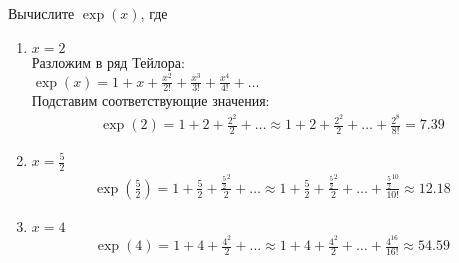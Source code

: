 		\subsection{}
		Вычислите $\exp(x)$, где	
		\begin{enumerate}
		\item $x = 2$\\
			Разложим в ряд Тейлора:\\
			$\exp(x) = 1 + x + \frac{x^{2}}{2!} + \frac{x^{3}}{3!} + \frac{x^{4}}{4!} + \ldots$\\
			Подставим соответствующие значения:\\
			\begin{gather*}
				\exp(2) = 1 + 2 + \frac{2^2}{2} + \ldots \approx 1 + 2 + \frac{2^2}{2} + \ldots + \frac{2^{8}}{8!} = 7.39
			\end{gather*}
		
		\item $x = \frac{5}{2}$\\
			\begin{gather*}
				\exp(\frac{5}{2}) = 1 + \frac{5}{2} + \frac{{\frac{5}{2}}^2}{2} + \ldots \approx 1 + \frac{5}{2} + \frac{{\frac{5}{2}}^2}{2} + \ldots + \frac{{\frac{5}{2}}^{10}}{10!} \approx 12.18
			\end{gather*}
		\item $x = 4$\\
			\begin{gather*}
				\exp(4) = 1 + 4 + \frac{4^2}{2} + \ldots \approx 1 + 4 + \frac{4^2}{2} + \ldots + \frac{4^{16}}{16!} \approx 54.59
			\end{gather*}
		\end{enumerate}
